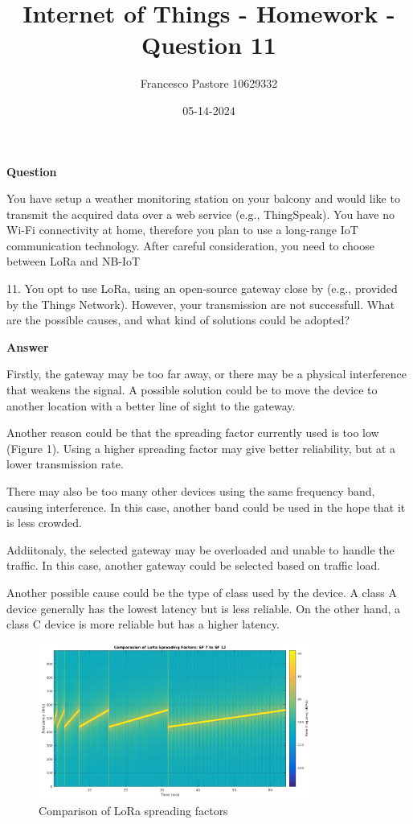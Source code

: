 \documentclass[12pt]{article}
\title{Internet of Things - Homework - Question 11}
\author{Francesco Pastore 10629332}
\date{05-14-2024}
\begin{document}
\maketitle

\textbf{Question}

You have setup a weather monitoring station on your balcony and would like to transmit the acquired data over a web service (e.g., ThingSpeak).
You have no Wi-Fi connectivity at home, therefore you plan to use a long-range IoT communication technology.
After careful consideration, you need to choose between LoRa and NB-IoT

11. You opt to use LoRa, using an open-source gateway close by (e.g., provided by the Things Network).
However, your transmission are not successfull. What are the possible causes, and what kind of solutions could be adopted?

\textbf{Answer}

Firstly, the gateway may be too far away, or there may be a physical interference that weakens the signal.
A possible solution could be to move the device to another location with a better line of sight to the gateway.

Another reason could be that the spreading factor currently used is too low (Figure 1).
Using a higher spreading factor may give better reliability, but at a lower transmission rate.

There may also be too many other devices using the same frequency band, causing interference.
In this case, another band could be used in the hope that it is less crowded.

Addiitonaly, the selected gateway may be overloaded and unable to handle the traffic.
In this case, another gateway could be selected based on traffic load.

Another possible cause could be the type of class used by the device.
A class A device generally has the lowest latency but is less reliable.
On the other hand, a class C device is more reliable but has a higher latency.

\begin{figure}[h]
    \centering
    \includegraphics[width=0.8\textwidth]{./spreading-factor.png}
    \caption{Comparison of LoRa spreading factors}
\end{figure}
\end{document}
